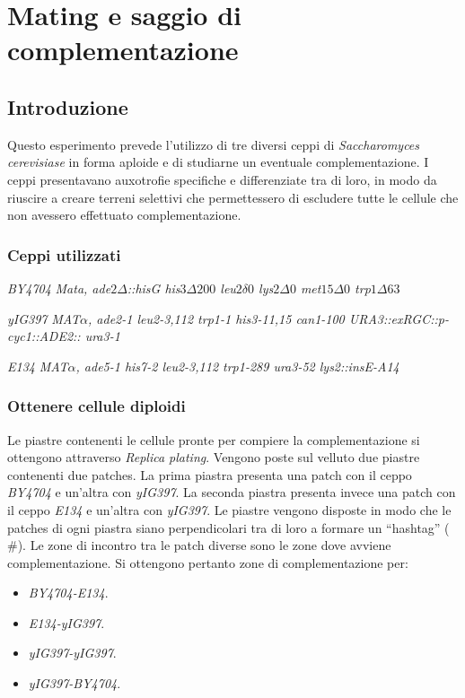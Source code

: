 \section*{Mating e saggio di complementazione}

	\subsection*{Introduzione}
	Questo esperimento prevede l'utilizzo di tre diversi ceppi di \emph{Saccharomyces cerevisiase} in forma aploide e di studiarne un eventuale complementazione.
	I ceppi presentavano auxotrofie specifiche e differenziate tra di loro, in modo da riuscire a creare terreni selettivi che permettessero di escludere tutte le cellule che non avessero effettuato complementazione.
	
		\subsubsection*{Ceppi utilizzati}
		\begin{center}
			\emph{BY4704} \emph{Mata, ade$2\Delta$::hisG his$3\Delta200$ leu$2\delta 0$ lys$2\Delta0$ met$15\Delta0$ trp$1\Delta63$}
		\end{center}
		\begin{center}
			\emph{yIG397} \emph{MAT$\alpha$, ade2-1 leu2-3,112 trp1-1 his3-11,15 can1-100 URA3::exRGC::p-cyc1::ADE2:: ura3-1}
		\end{center}
		\begin{center}
			\emph{E134} \emph{MAT$\alpha$, ade5-1 his7-2 leu2-3,112 trp1-289 ura3-52 lys2::insE-A14}
		\end{center}

		\subsubsection*{Ottenere cellule diploidi}
		Le piastre contenenti le cellule pronte per compiere la complementazione si ottengono attraverso \emph{Replica plating}.
		Vengono poste sul velluto due piastre contenenti due patches.
		La prima piastra presenta una patch con il ceppo \emph{BY4704} e un'altra con \emph{yIG397}.
		La seconda piastra presenta invece una patch con il ceppo \emph{E134} e un'altra con \emph{yIG397}.
		Le piastre vengono disposte in modo che le patches di ogni piastra siano perpendicolari tra di loro a formare un ``hashtag'' ($\#$).
		Le zone di incontro tra le patch diverse sono le zone dove avviene complementazione.
		Si ottengono pertanto zone di complementazione per:
		\begin{multicols}{4}
			\begin{itemize}
				\item \emph{BY4704-E134}.
				\item \emph{E134-yIG397}.
				\item \emph{yIG397-yIG397}.
				\item \emph{yIG397-BY4704}.
			\end{itemize}
		\end{multicols}

